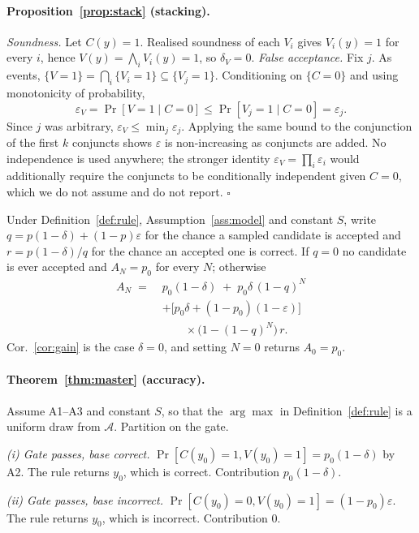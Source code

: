\documentclass[11pt]{article}
\begin{document}
\paragraph{Proposition~\ref{prop:stack} (stacking).}
\emph{Soundness.} Let $C(y)=1$. Realised soundness of each $V_i$ gives $V_i(y)=1$ for every $i$, hence $V(y)=\bigwedge_iV_i(y)=1$, so $\delta_V=0$.
\emph{False acceptance.} Fix $j$. As events, $\{V=1\}=\bigcap_i\{V_i=1\}\subseteq\{V_j=1\}$. Conditioning on $\{C=0\}$ and using monotonicity of probability,
\[\varepsilon_V=\Pr[V{=}1\mid C{=}0]\le\Pr[V_j{=}1\mid C{=}0]=\varepsilon_j.\]
Since $j$ was arbitrary, $\varepsilon_V\le\min_j\varepsilon_j$. Applying the same bound to the conjunction of the first $k$ conjuncts shows $\varepsilon$ is non-increasing as conjuncts are added. No independence is used anywhere; the stronger identity $\varepsilon_V=\prod_i\varepsilon_i$ would additionally require the conjuncts to be conditionally independent given $C=0$, which we do not assume and do not report. \hfill$\square$

\begin{theorem}\label{thm:master}
Under Definition~\ref{def:rule}, Assumption~\ref{ass:model} and constant $S$,
write $q=p(1-\delta)+(1-p)\varepsilon$ for the chance a sampled candidate is
accepted and $r=p(1-\delta)/q$ for the chance an accepted one is correct. If
$q=0$ no candidate is ever accepted and $A_N=p_0$ for every $N$; otherwise
\[
\begin{aligned}
A_N \;=\;& p_0(1-\delta) \;+\; p_0\delta\,(1-q)^N \\
&+\bigl[p_0\delta+(1-p_0)(1-\varepsilon)\bigr]\\
&\qquad\times\bigl(1-(1-q)^N\bigr)\,r .
\end{aligned}
\]
Cor.~\ref{cor:gain} is the case $\delta=0$, and setting $N=0$ returns $A_0=p_0$.
\end{theorem}

\paragraph{Theorem~\ref{thm:master} (accuracy).}
Assume A1--A3 and constant $S$, so that the $\arg\max$ in Definition~\ref{def:rule} is a uniform draw from $\mathcal{A}$. Partition on the gate.

\emph{(i) Gate passes, base correct.} $\Pr[C(y_0){=}1,V(y_0){=}1]=p_0(1-\delta)$ by A2. The rule returns $y_0$, which is correct. Contribution $p_0(1-\delta)$.

\emph{(ii) Gate passes, base incorrect.} $\Pr[C(y_0){=}0,V(y_0){=}1]=(1-p_0)\varepsilon$. The rule returns $y_0$, which is incorrect. Contribution $0$.
\end{document}
